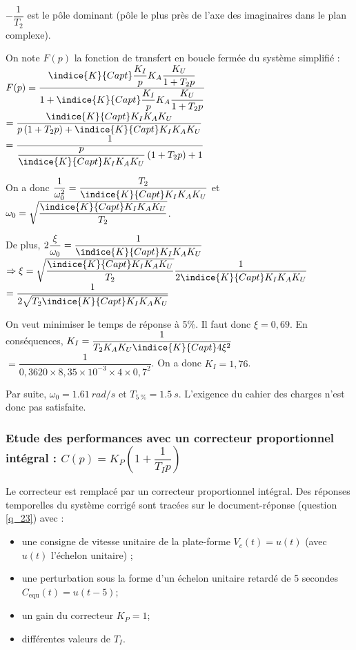 \ifprof
\begin{corrige}
$-\dfrac{1}{T_2}$ est le pôle dominant (pôle le plus près de l'axe des imaginaires dans le plan complexe). 

On note $F(p)$ la fonction de transfert en boucle fermée du système simplifié : 
$F(p) = \dfrac{\indice{K}{Capt} \dfrac{K_I}{p} K_A \dfrac{K_U}{1+T_2 p}}{1+\indice{K}{Capt} \dfrac{K_I}{p} K_A \dfrac{K_U}{1+T_2 p}}$
$= \dfrac{\indice{K}{Capt} K_I K_A K_U}{p\left(1+T_2 p\right)+\indice{K}{Capt} K_I K_AK_U}$
$= \dfrac{1}{\dfrac{p}{\indice{K}{Capt} K_I K_AK_U}\left(1+T_2 p\right)+1}$

On a donc $\dfrac{1}{\omega_0^2} = \dfrac{T_2 }{\indice{K}{Capt} K_I K_AK_U}$ et 
$\omega_0 = \sqrt{\dfrac{\indice{K}{Capt} K_I K_AK_U}{T_2 }}$.


De plus, 
$2\dfrac{\xi}{\omega_0} = \dfrac{1}{\indice{K}{Capt} K_I K_AK_U}$ 
$\Rightarrow \xi = \sqrt{\dfrac{\indice{K}{Capt} K_I K_AK_U}{T_2 }}\dfrac{1}{2\indice{K}{Capt} K_I K_AK_U} $
$ = \dfrac{1}{2\sqrt{T_2 \indice{K}{Capt} K_I K_AK_U}} $

On veut minimiser le temps de réponse à 5\%. Il faut donc $\xi=0,69$. 
En conséquences, $ K_I = \dfrac{1}{T_2 K_AK_U \indice{K}{Capt}  4\xi^2} $ $=\dfrac{1}{0,36 20 \times 8,3  5 \times 10^{-3} \times 4\times 0,7^2}$. On a donc 
$ K_I = 1,76$.

Par suite, $\omega_0 = \SI{1,61}{rad/s}$ et $T_{\SI{5}{\%}} = \SI{1,5}{s}$. 
L'exigence du cahier des charges n'est donc pas satisfaite.


\end{corrige}
\else
\fi



\subsubsection{Etude des performances avec un correcteur proportionnel intégral : $C(p)={K_P}\left(1+\dfrac{1}{T_I p}\right)$}

Le correcteur est remplacé par un correcteur proportionnel intégral. Des réponses temporelles du système corrigé sont tracées sur le document-réponse (question \ref{q_23}) avec :
\begin{itemize}
\item une consigne de vitesse unitaire de la plate-forme $V_c (t)= u(t)$ (avec $u(t)$ l’échelon unitaire) ;
\item une perturbation sous la forme d’un échelon unitaire retardé de 5 secondes $C_{\text{equ}} (t) = u(t - 5)$;
\item un gain du correcteur $K_P = 1$;
\item différentes valeurs de $T_I$.
\end{itemize}

